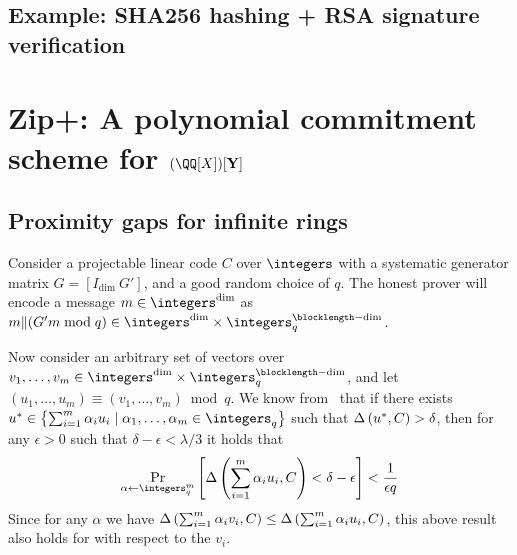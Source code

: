 \documentclass[11pt,letterpaper,usenames,dvipsnames]{article}
\begin{document}
        
    
       


\subsection{Example: SHA256 hashing + RSA signature verification}

\section{Zip+: A polynomial commitment scheme for $(\QQ[X])[\vec Y]$}

	
\subsection{Proximity gaps for infinite rings}
\label{sec:proximity-gap}

Consider a projectable linear code $C$ over $\integers$ with a systematic generator matrix $G = [I_{\dim} \ G']$, and a good random choice of $q$. The honest prover will encode a message $m \in \integers^{\dim}$ as $m \| (G'm \bmod q) \in \integers^{\dim} \times \integers_{q}^{\blocklength-\dim}$.

Now consider an arbitrary set of vectors over $v_1,\dotsc,v_{m} \in \integers^{\dim} \times \integers_{q}^{\blocklength-\dim}$, and let $(u_1,\dotsc,u_m) \equiv (v_1,\dotsc,v_{m}) \bmod q$. We know from~\cite[Theorem 4.1]{BKS18} that if there exists $u^\ast \in \set{\sum_{i=1}^{m} \alpha_i u_i \mid \alpha_1,\dotsc,\alpha_m \in \integers_q}$ such that $\Delta\left(u^\ast,C\right) > \delta$, then for any $\epsilon > 0$ such that $\delta-\epsilon < \lambda/3$ it holds that
\[
\Pr_{\alpha \gets \integers_{q}^m} \left[\reldist{\sum_{i=1}^{m} \alpha_i u_i}{C} < \delta - \epsilon\right] < \frac{1}{\epsilon q}
\]
Since for any $\alpha$ we have $\Delta\left(\sum_{i=1}^{m} \alpha_i v_i,C\right) \leq \Delta\left(\sum_{i=1}^{m} \alpha_i u_i,C\right)$, this above result also holds for with respect to the $v_i$.

\end{document}
